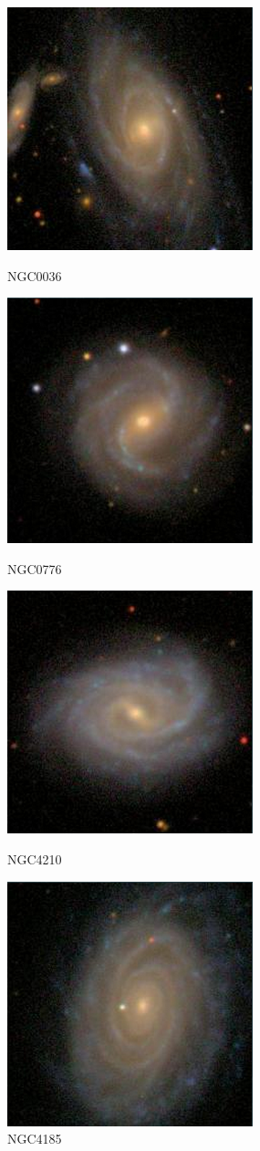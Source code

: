 \documentclass[9pt]{revtex4-1}
\begin{document}
\begin{figure}[h]
\includegraphics[scale=0.3]{NGC0036.png}
\caption{NGC0036}
\includegraphics[scale=0.3]{NGC0776.png}
\caption{NGC0776}
\includegraphics[scale=0.3]{NGC4210.png}
\caption{NGC4210}
\includegraphics[scale=0.3]{NGC4185.png}
\caption{NGC4185}

\end{figure}
\end{document}
